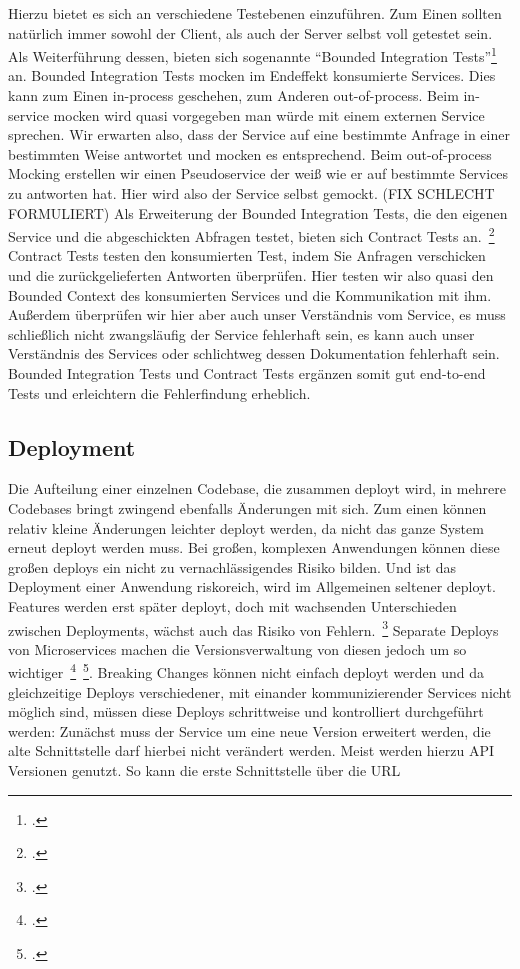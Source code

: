 Hierzu bietet es sich an verschiedene Testebenen einzuführen. Zum Einen sollten natürlich immer sowohl der Client, als auch der Server selbst voll getestet sein. Als Weiterführung dessen, bieten sich sogenannte ``Bounded Integration Tests''\footcite[vgl.][]{rails:soa} an. Bounded Integration Tests mocken im Endeffekt konsumierte Services. Dies kann zum Einen in-process geschehen, zum Anderen out-of-process. Beim in-service mocken wird quasi vorgegeben man würde mit einem externen Service sprechen. Wir erwarten also, dass der Service auf eine bestimmte Anfrage in einer bestimmten Weise antwortet und mocken es entsprechend. Beim out-of-process Mocking erstellen wir einen Pseudoservice der weiß wie er auf bestimmte Services zu antworten hat. Hier wird also der Service selbst gemockt. (FIX SCHLECHT FORMULIERT)
Als Erweiterung der Bounded Integration Tests, die den eigenen Service und die abgeschickten Abfragen testet, bieten sich Contract Tests an.~\footcite[vgl.][]{fowler:contracts} Contract Tests testen den konsumierten Test, indem Sie Anfragen verschicken und die zurückgelieferten Antworten überprüfen. Hier testen wir also quasi den Bounded Context des konsumierten Services und die Kommunikation mit ihm. Außerdem überprüfen wir hier aber auch unser Verständnis vom Service, es muss schließlich nicht zwangsläufig der Service fehlerhaft sein, es kann auch unser Verständnis des Services oder schlichtweg dessen Dokumentation fehlerhaft sein.
Bounded Integration Tests und Contract Tests ergänzen somit gut end-to-end Tests und erleichtern die Fehlerfindung erheblich.

\subsection{Deployment}
Die Aufteilung einer einzelnen Codebase, die zusammen deployt wird, in mehrere Codebases bringt zwingend ebenfalls Änderungen mit sich.
Zum einen können relativ kleine Änderungen leichter deployt werden, da nicht das ganze System erneut deployt werden muss. Bei großen, komplexen Anwendungen können diese großen deploys ein nicht zu vernachlässigendes Risiko bilden. Und ist das Deployment einer Anwendung riskoreich, wird im Allgemeinen seltener deployt. Features werden erst später deployt, doch mit wachsenden Unterschieden zwischen Deployments, wächst auch das Risiko von Fehlern.~\footcite[vgl.][Seite 6]{newman2015building}
Separate Deploys von Microservices machen die Versionsverwaltung von diesen jedoch um so wichtiger~\footcite[vgl.][Seite 62]{newman2015building}~\footcite[vgl.][]{Vergleichsartikel}. Breaking Changes können nicht einfach deployt werden und da gleichzeitige Deploys verschiedener, mit einander kommunizierender Services nicht möglich sind, müssen diese Deploys schrittweise und kontrolliert durchgeführt werden: Zunächst muss der Service um eine neue Version erweitert werden, die alte Schnittstelle darf hierbei nicht verändert werden. Meist werden hierzu API Versionen genutzt. So kann die erste Schnittstelle über die URL

